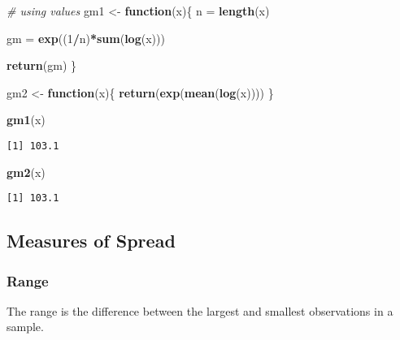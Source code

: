 \documentclass[12pt,]{article}
\newenvironment{Shaded}{\begin{snugshade}}{\end{snugshade}}
\newcommand{\CommentTok}[1]{\textcolor[rgb]{0.56,0.35,0.01}{\textit{#1}}}
\newcommand{\ControlFlowTok}[1]{\textcolor[rgb]{0.13,0.29,0.53}{\textbf{#1}}}
\newcommand{\DecValTok}[1]{\textcolor[rgb]{0.00,0.00,0.81}{#1}}
\newcommand{\KeywordTok}[1]{\textcolor[rgb]{0.13,0.29,0.53}{\textbf{#1}}}
\newcommand{\NormalTok}[1]{#1}
\newcommand{\OperatorTok}[1]{\textcolor[rgb]{0.81,0.36,0.00}{\textbf{#1}}}
\newcommand{\StringTok}[1]{\textcolor[rgb]{0.31,0.60,0.02}{#1}}
\begin{document}
\begin{Shaded}
\begin{Highlighting}[]
\CommentTok{# using values }
\NormalTok{gm1 <-}\StringTok{ }\ControlFlowTok{function}\NormalTok{(x)\{}
\NormalTok{  n =}\StringTok{ }\KeywordTok{length}\NormalTok{(x)}
  
\NormalTok{  gm =}\StringTok{ }\KeywordTok{exp}\NormalTok{((}\DecValTok{1}\OperatorTok{/}\NormalTok{n)}\OperatorTok{*}\KeywordTok{sum}\NormalTok{(}\KeywordTok{log}\NormalTok{(x)))}

  \KeywordTok{return}\NormalTok{(gm)}
\NormalTok{\}}

\NormalTok{gm2 <-}\StringTok{ }\ControlFlowTok{function}\NormalTok{(x)\{}
  \KeywordTok{return}\NormalTok{(}\KeywordTok{exp}\NormalTok{(}\KeywordTok{mean}\NormalTok{(}\KeywordTok{log}\NormalTok{(x))))}
\NormalTok{\}}
\end{Highlighting}
\end{Shaded}

\begin{Shaded}
\begin{Highlighting}[]
\KeywordTok{gm1}\NormalTok{(x)}
\end{Highlighting}
\end{Shaded}

\begin{verbatim}
[1] 103.1
\end{verbatim}

\begin{Shaded}
\begin{Highlighting}[]
\KeywordTok{gm2}\NormalTok{(x)}
\end{Highlighting}
\end{Shaded}

\begin{verbatim}
[1] 103.1
\end{verbatim}

\hypertarget{measures-of-spread}{%
\subsection{Measures of Spread}\label{measures-of-spread}}

\hypertarget{range}{%
\subsubsection{Range}\label{range}}

The range is the difference between the largest and smallest
observations in a sample.
\end{document}

